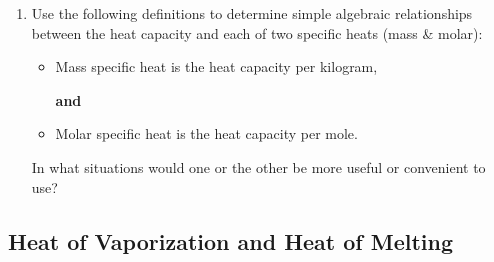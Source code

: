 \begin{enumerate}
		
	\item Use the following definitions to determine simple algebraic relationships between the heat capacity and each of two specific heats (mass \& molar): 
	
	\begin{itemize}
		\item Mass specific heat is the heat capacity per kilogram,
		
		\textbf{and}
		
		\item Molar specific heat is the heat capacity per mole.
	\end{itemize}	

	In what situations would one or the other be more useful or convenient to use?
		
\end{enumerate}

\subsection{Heat of Vaporization and Heat of Melting}
\label{1.2.1B}

